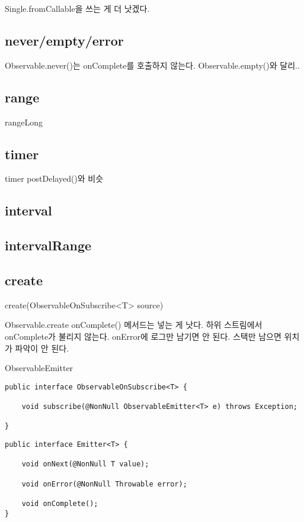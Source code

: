 \documentclass{book}
\begin{document}
Single.fromCallable을 쓰는 게 더 낫겠다.

\subsection{never/empty/error}
Observable.never()는 onComplete를 호출하지 않는다. Observable.empty()와 달리..

\subsection{range}
rangeLong

\subsection{timer}
timer postDelayed()와 비슷

\subsection{interval}

\subsection{intervalRange}



\subsection{create}
create(ObservableOnSubscribe<T> source)

Observable.create
onComplete() 메서드는 넣는 게 낫다. 
하위 스트림에서 onComplete가 불리지 않는다.
onError에 로그만 남기면 안 된다. 스택만 남으면 위치가 파악이 안 된다. 

ObservableEmitter

\begin{verbatim}
public interface ObservableOnSubscribe<T> {

    void subscribe(@NonNull ObservableEmitter<T> e) throws Exception;
    
}
\end{verbatim}

\begin{verbatim}
public interface Emitter<T> {

    void onNext(@NonNull T value);

    void onError(@NonNull Throwable error);

    void onComplete();
}
\end{verbatim}
\end{document}
